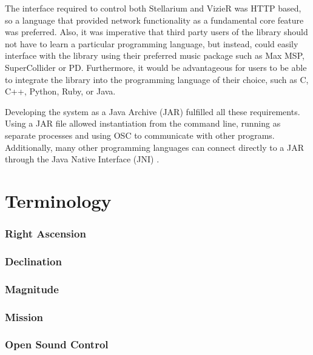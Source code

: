 \documentclass[10pt,a4paper,extrafontsizes]{memoir}
\begin{document}
The interface required to control both Stellarium and VizieR was HTTP based, so a language that provided network functionality as a fundamental core feature was preferred. Also, it was imperative that third party users of the library should not have to learn a particular programming language, but instead, could easily interface with the library using their preferred music package such as Max MSP, SuperCollider or PD. Furthermore, it would be advantageous for users to be able to integrate the library  into the programming language of their choice, such as C, C++, Python, Ruby, or Java. 

Developing the system as a Java Archive (JAR) fulfilled all these requirements. Using a JAR file allowed instantiation from the command line, running as separate processes and using OSC to communicate with other programs. Additionally, many other programming languages can connect directly to a JAR through the Java Native Interface (JNI) \cite{liang1999java}. 


\chapter{Terminology}

\subsection{Right Ascension}

\subsection{Declination}

\subsection{Magnitude}

\subsection{Mission}
	
\subsection{Open Sound Control}


\cleardoublepage
{}

\mainmatter
\end{document}
